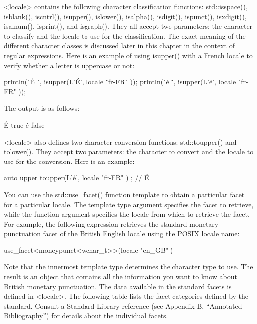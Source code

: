 
<locale> contains the following character classification functions: std::isspace(), isblank(), iscntrl(), isupper(), islower(), isalpha(), isdigit(), ispunct(), isxdigit(), isalnum(), isprint(), and isgraph(). They all accept two parameters: the character to classify and the locale to use for the classification. The exact meaning of the different character classes is discussed later in this chapter in the context of regular expressions. Here is an example of using isupper() with a French locale to verify whether a letter is uppercase or not:

\begin{cpp}
println("É {}", isupper(L'É', locale{ "fr-FR" }));
println("é {}", isupper(L'é', locale{ "fr-FR" }));
\end{cpp}

The output is as follows:

\begin{shell}
É true
é false
\end{shell}


<locale> also defines two character conversion functions: std::toupper() and tolower(). They accept two parameters: the character to convert and the locale to use for the conversion. Here is an example:

\begin{cpp}
auto upper { toupper(L'é', locale { "fr-FR" }) }; // É
\end{cpp}


You can use the std::use\_facet() function template to obtain a particular facet for a particular locale. The template type argument specifies the facet to retrieve, while the function argument specifies the locale from which to retrieve the facet. For example, the following expression retrieves the standard monetary punctuation facet of the British English locale using the POSIX locale name:

\begin{cpp}
use_facet<moneypunct<wchar_t>>(locale { "en_GB" })
\end{cpp}

Note that the innermost template type determines the character type to use. The result is an object that contains all the information you want to know about British monetary punctuation. The data available in the standard facets is defined in <locale>. The following table lists the facet categories defined by the standard. Consult a Standard Library reference (see Appendix B, “Annotated Bibliography”) for details about the individual facets.

